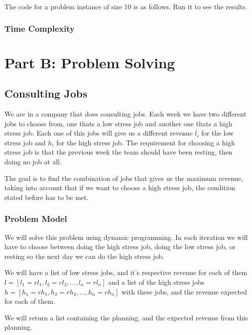 \documentclass{article}
\begin{document}
The code for a problem instance of size 10 is as follows. Run it to see the results.



\subsubsection*{Time Complexity}


\section*{Part B: Problem Solving}


\subsection*{Consulting Jobs}

We are in a company that does consulting jobs. Each week we have two different jobs to choose from, one thats a low stress job and another one thats a high stress job. Each one of this jobs will give us a different revenue $l_i$ for the low stress job and $h_i$ for the high stress job. The requirement for choosing a high stress job is that the previous week the team should have been resting, then doing no job at all. 

The goal is to find the combination of jobs that gives us the maximum revenue, taking into account that if we want to choose a high stress job, the condition stated before has to be met.

\subsubsection*{Problem Model}

We will solve this problem using dynamic programming. In each iteration we will have to choose between doing the high stress job, doing the low stress job, or resting so the next day we can do the high stress job.

We will have a list of low stress jobs, and it's respective revenue for each of them $l = [l_1 = rl_1,l_2 = rl_2,...,l_n = rl_n]$ and a list of the high stress jobs $h = [h_1 = rh_1, h_2 = rh_2,...,h_n = rh_n]$ with these jobs, and the revenue expected for each of them.

We will return a list containing the planning, and the expected revenue from this planning.
\end{document}
